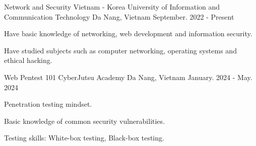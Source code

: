 

\begin{cventries}

  \cventry
    {Network and Security} %
    {Vietnam - Korea University of Information and Communication
Technology} %
    {Da Nang, Vietnam} %
    {September. 2022 - Present} %
    {
      \begin{cvitems} %
        \item {Have basic knowledge of networking, web development and information
security.}
        \item {Have studied subjects such as computer networking, operating systems and
ethical hacking.}
      \end{cvitems}
    }

    \cventry
    {Web Pentest 101} %
    {CyberJutsu Academy} %
    {Da Nang, Vietnam} %
    {January. 2024 - May. 2024} %
    {
      \begin{cvitems} %
        \item {Penetration testing mindset.}
        \item {Basic knowledge of common security vulnerabilities.}
        \item {Testing skills: White-box testing, Black-box testing.}
      \end{cvitems}
    }

\end{cventries}
